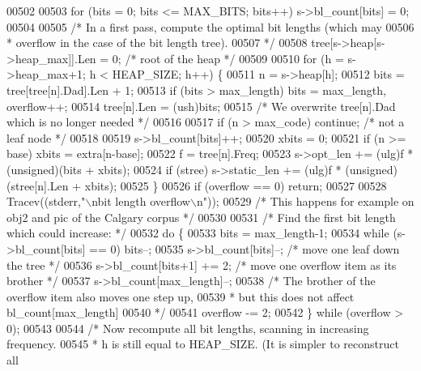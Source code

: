 \begin{DoxyCode}
{{{{{{{{{00502 
00503     \textcolor{keywordflow}{for} (bits = 0; bits <= MAX\_BITS; bits++) s->bl\_count[bits] = 0;
00504 
00505     \textcolor{comment}{/* In a first pass, compute the optimal bit lengths (which may}
00506 \textcolor{comment}{     * overflow in the case of the bit length tree).}
00507 \textcolor{comment}{     */}
00508     tree[s->heap[s->heap\_max]].Len = 0; \textcolor{comment}{/* root of the heap */}
00509 
00510     for (h = s->heap\_max+1; h < HEAP\_SIZE; h++) \{
00511         n = s->heap[h];
00512         bits = tree[tree[n].Dad].Len + 1;
00513         \textcolor{keywordflow}{if} (bits > max\_length) bits = max\_length, overflow++;
00514         tree[n].Len = (ush)bits;
00515         \textcolor{comment}{/* We overwrite tree[n].Dad which is no longer needed */}
00516 
00517         \textcolor{keywordflow}{if} (n > max\_code) \textcolor{keywordflow}{continue}; \textcolor{comment}{/* not a leaf node */}
00518 
00519         s->bl\_count[bits]++;
00520         xbits = 0;
00521         \textcolor{keywordflow}{if} (n >= base) xbits = extra[n-base];
00522         f = tree[n].Freq;
00523         s->opt\_len += (ulg)f * (\textcolor{keywordtype}{unsigned})(bits + xbits);
00524         \textcolor{keywordflow}{if} (stree) s->static\_len += (ulg)f * (\textcolor{keywordtype}{unsigned})(stree[n].Len + xbits);
00525     \}
00526     \textcolor{keywordflow}{if} (overflow == 0) \textcolor{keywordflow}{return};
00527 
00528     Tracev((stderr,\textcolor{stringliteral}{"\(\backslash\)nbit length overflow\(\backslash\)n"}));
00529     \textcolor{comment}{/* This happens for example on obj2 and pic of the Calgary corpus */}
00530 
00531     \textcolor{comment}{/* Find the first bit length which could increase: */}
00532     \textcolor{keywordflow}{do} \{
00533         bits = max\_length-1;
00534         \textcolor{keywordflow}{while} (s->bl\_count[bits] == 0) bits--;
00535         s->bl\_count[bits]--;      \textcolor{comment}{/* move one leaf down the tree */}
00536         s->bl\_count[bits+1] += 2; \textcolor{comment}{/* move one overflow item as its brother */}
00537         s->bl\_count[max\_length]--;
00538         \textcolor{comment}{/* The brother of the overflow item also moves one step up,}
00539 \textcolor{comment}{         * but this does not affect bl\_count[max\_length]}
00540 \textcolor{comment}{         */}
00541         overflow -= 2;
00542     \} \textcolor{keywordflow}{while} (overflow > 0);
00543 
00544     \textcolor{comment}{/* Now recompute all bit lengths, scanning in increasing frequency.}
00545 \textcolor{comment}{     * h is still equal to HEAP\_SIZE. (It is simpler to reconstruct all}
}}}}}}}}}
\end{DoxyCode}
